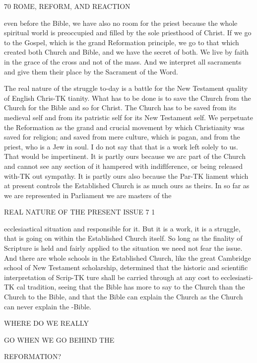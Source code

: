 \documentclass[12pt,a5paper,oneside]{book}
\begin{document}
70 ROME, REFORM, AND REACTION 

even before the Bible, we have also no room for the 
priest because the whole spiritual world is preoccupied 
and filled by the sole priesthood of Christ. If we 
go to the Gospel, which is the grand Reformation 
principle, we go to that which created both Church 
and Bible, and we have the secret of both. We live 
by faith in the grace of the cross and not of the mass. 
And we interpret all sacraments and give them their 
place by the Sacrament of the Word. 

The real nature of the struggle to-day is a battle 
for the New Testament quality of English Chris-TK
tianity. What has to be done is to save the Church 
from the Church for the Bible and so for Christ. 
The Church has to be saved from its medieval self and 
from its patristic self for its New Testament self. 
We perpetuate the Reformation as the grand and 
crucial movement by which Christianity was saved 
for religion; and saved from mere culture, which is 
pagan, and from the priest, who is a Jew in soul. I 
do not say that that is a work left solely to us. That 
would be impertinent. It is partly ours because we 
arc part of the Church and cannot see any section of 
it hampered with indiflference, or being released with-TK
out sympathy. It is partly ours also because the Par-TK
liament which at present controls the Established 
Church is as much ours as theirs. In so far as we 
are represented in Parliament we are masters of the 



REAL NATURE OF THE PRESENT ISSUE 7 1 

ecclesiastical situation and responsible for it. But it 
is a work, it is a struggle, that is going on within the 
Established Church itself. So long as the finality of 
Scripture is held and fairly applied to the situation we 
need not fear the issue. And there are whole schools 
in the Established Church, like the great Cambridge 
school of New Testament scholarship, determined 
that the historic and scientific interpretation of Scrip-TK
ture shall be carried through at any cost to ecclesiasti-TK
cal tradition, seeing that the Bible has more to say 
to the Church than the Church to the Bible, and 
that the Bible can explain the Church as the Church 
can never explain the -Bible. 



WHERE DO WE REALLY 

GO WHEN WE GO BEHIND THE 

REFORMATION? 
\end{document}
